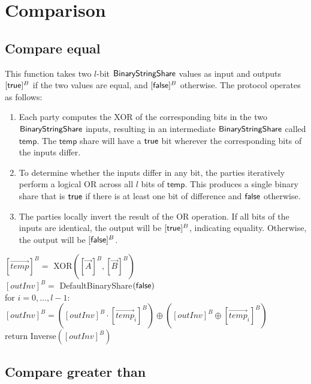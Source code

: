 \section{Comparison}
\label{sec:comparison}

\subsection{Compare equal}
\label{sec:compare_eq}

This function takes two $l$-bit ${\mathsf{BinaryStringShare}}$ values as input and outputs $[\mathsf{true}]^B$ if the two values are equal, and $[\mathsf{false}]^B$ otherwise. The protocol operates as follows:
\begin{enumerate}
    \item Each party computes the XOR of the corresponding bits in the two ${\mathsf{BinaryStringShare}}$ inputs, resulting in an intermediate ${\mathsf{BinaryStringShare}}$ called $\mathsf{temp}$. The $\mathsf{temp}$ share will have a $\mathsf{true}$ bit wherever the corresponding bits of the inputs differ.

    \item To determine whether the inputs differ in any bit, the parties iteratively perform a logical OR across all $l$ bits of $\mathsf{temp}$. This produces a single binary share that is $\mathsf{true}$ if there is at least one bit of difference and $\mathsf{false}$ otherwise.

    \item The parties locally invert the result of the OR operation. If all bits of the inputs are identical, the output will be $[\mathsf{true}]^B$, indicating equality. Otherwise, the output will be $[\mathsf{false}]^B$.
\end{enumerate}

\begin{protocol}[CompareEqual$({[\vec{A}]^B}, {[\vec{B}]^B})$]
	${[\vec{temp}]^B} =$ XOR$({[\vec{A}]^B}, {[\vec{B}]^B})$\\
	$[outInv]^B = $ DefaultBinaryShare$(\mathsf{false})$ \\
	for $i = 0, \ldots, l - 1$:\\
	\indent $[outInv]^B = ([outInv]^B \cdot [\vec{temp}_i]^B) \oplus ([outInv]^B \oplus [\vec{temp}_i]^B)$\\
	return Inverse$([outInv]^B)$
\end{protocol}

\subsection{Compare greater than}
\label{sec:compare_ge}

